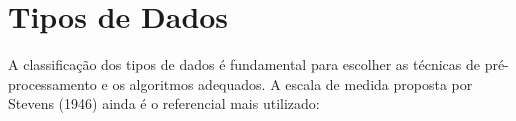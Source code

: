 \documentclass[12pt,a4paper]{article}
\begin{document}

\section{Tipos de Dados}

A classificação dos tipos de dados é fundamental para escolher as técnicas de pré-processamento e os algoritmos adequados. A escala de medida proposta por Stevens (1946) ainda é o referencial mais utilizado:
\end{document}
